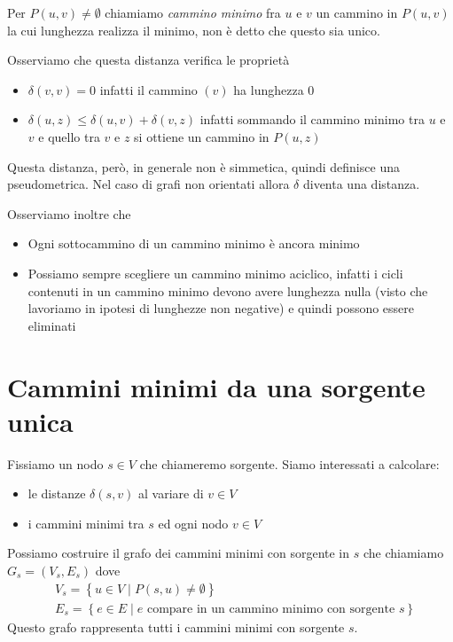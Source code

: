 \documentclass[a4paper,10pt]{amsbook}
\theoremstyle{plain}
\theoremstyle{definition}
\theoremstyle{remark}
\newcommand{\set}[1]{\left\{#1\right\}}
\begin{document}
Per $P(u,v) \neq \emptyset$ chiamiamo \textit{cammino minimo} fra $u$
e $v$ un cammino in $P(u,v)$ la cui lunghezza realizza il minimo, non
\`e detto che questo sia unico.

Osserviamo che questa distanza verifica le proprietà
\begin{itemize}
\item $\delta(v,v) = 0$ infatti il cammino $(v)$ ha lunghezza $0$
\item $\delta(u,z) \le \delta(u,v) + \delta(v,z)$ infatti sommando il
  cammino minimo tra $u$ e $v$ e quello tra $v$ e $z$ si ottiene un
  cammino in $P(u,z)$
\end{itemize}
Questa distanza, però, in generale non è simmetica, quindi definisce
una pseudometrica. Nel caso di grafi non orientati allora $\delta$
diventa una distanza.

Osserviamo inoltre che
\begin{itemize}
\item Ogni sottocammino di un cammino minimo è ancora minimo
\item Possiamo sempre scegliere un cammino minimo aciclico, infatti i
  cicli contenuti in un cammino minimo devono avere lunghezza nulla
  (visto che lavoriamo in ipotesi di lunghezze non negative) e quindi
  possono essere eliminati
\end{itemize}

\section{Cammini minimi da una sorgente unica}

Fissiamo un nodo $s \in V$ che chiameremo sorgente. Siamo interessati
a calcolare:
\begin{itemize}
\item le distanze $\delta(s,v)$ al variare di $v\in V$
\item i cammini minimi tra $s$ ed ogni nodo $v\in V$
\end{itemize}

Possiamo costruire il grafo dei cammini minimi con sorgente in $s$ che
chiamiamo $G_s = (V_s,E_s)$ dove
\begin{align*}
  &V_s = \set{ u\in V \mid P(s,u) \neq \emptyset } \\
 &E_s = \set{ e\in E \mid e\text{ compare in un cammino minimo con
    sorgente }s}
\end{align*}
Questo grafo rappresenta tutti i cammini minimi con sorgente $s$.
\end{document}
